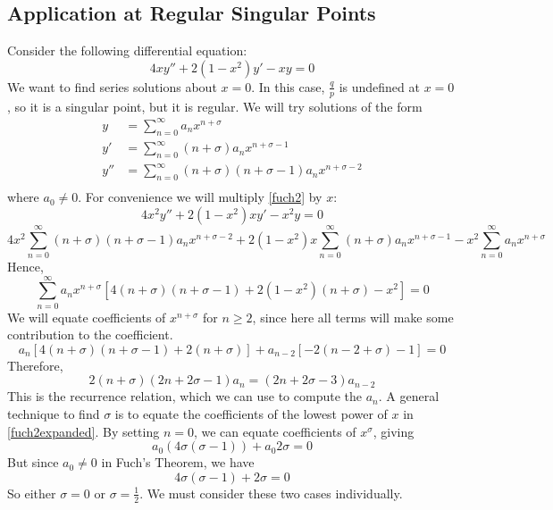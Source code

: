 \subsection{Application at Regular Singular Points}
Consider the following differential equation:
\begin{equation}\label{fuch2}
	4xy'' + 2(1-x^2)y' - xy = 0
\end{equation}
We want to find series solutions about \(x=0\).
In this case, \(\frac{q}{p}\) is undefined at \(x=0\), so it is a singular point, but it is regular.
We will try solutions of the form
\begin{align*}
	y   & = \sum_{n=0}^\infty a_n x^{n + \sigma}                         \\
	y'  & = \sum_{n=0}^\infty (n+\sigma)a_n x^{n + \sigma-1}             \\
	y'' & = \sum_{n=0}^\infty (n+\sigma)(n+\sigma-1)a_n x^{n + \sigma-2} \\
\end{align*}
where \(a_0 \neq 0\).
For convenience we will multiply \eqref{fuch2} by \(x\):
\[
	4x^2y'' + 2(1-x^2)xy' - x^2y = 0
\]
\[
	4x^2\sum_{n=0}^\infty (n+\sigma)(n+\sigma-1)a_n x^{n + \sigma-2} + 2(1-x^2)x\sum_{n=0}^\infty (n+\sigma)a_n x^{n + \sigma-1} - x^2\sum_{n=0}^\infty a_n x^{n + \sigma}
\]
Hence,
\begin{equation}\label{fuch2expanded}
	\sum_{n=0}^\infty a_n x^{n + \sigma}\left[4(n+\sigma)(n+\sigma-1) + 2\left(1-x^2\right)(n+\sigma) - x^2\right] = 0
\end{equation}
We will equate coefficients of \(x^{n+\sigma}\) for \(n\geq 2\), since here all terms will make some contribution to the coefficient.
\[
	a_n\left[4(n+\sigma)(n+\sigma-1) + 2(n+\sigma)\right] + a_{n-2}\left[-2(n-2+\sigma) - 1\right] = 0
\]
Therefore,
\begin{equation}\label{fuch2recurrence}
	2(n+\sigma)(2n+2\sigma-1)a_n = (2n+2\sigma-3)a_{n-2}
\end{equation}
This is the recurrence relation, which we can use to compute the \(a_n\).
A general technique to find \(\sigma\) is to equate the coefficients of the lowest power of \(x\) in \eqref{fuch2expanded}.
By setting \(n=0\), we can equate coefficients of \(x^\sigma\), giving
\[
	a_0(4\sigma(\sigma - 1)) + a_0 2\sigma = 0
\]
But since \(a_0 \neq 0\) in Fuch's Theorem, we have
\[
	4\sigma(\sigma - 1) + 2\sigma = 0
\]
So either \(\sigma = 0\) or \(\sigma = \frac{1}{2}\).
We must consider these two cases individually.
